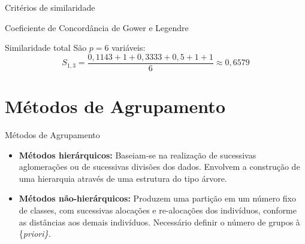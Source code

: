 \documentclass[
  ignorenonframetext,
  aspectratio=169,
]{beamer}
\providecommand{\tightlist}{%
  \setlength{\itemsep}{0pt}\setlength{\parskip}{0pt}}
\begin{document}
\begin{frame}{Critérios de similaridade}
\protect{}\label{crituxe9rios-de-similaridade-19}
\begin{block}{Coeficiente de Concordância de Gower e Legendre}
\protect{}\label{coeficiente-de-concorduxe2ncia-de-gower-e-legendre-12}
\begin{block}{Similaridade total}
\protect{}\label{similaridade-total}
São \(p=6\) variáveis: \[
S_{1,3}
=\dfrac{0,1143+1+0,3333+0,5+1+1}{6}
\approx 0,6579
\]
\end{block}
\end{block}
\end{frame}

\section{Métodos de Agrupamento}\label{muxe9todos-de-agrupamento}

\begin{frame}{Métodos de Agrupamento}
\protect{}\label{muxe9todos-de-agrupamento-1}
\begin{itemize}
\tightlist
\item
  \textbf{Métodos hierárquicos:} Baseiam-se na realização de sucessivas
  aglomerações ou de sucessivas divisões dos dados. Envolvem a
  construção de uma hierarquia através de uma estrutura do tipo árvore.
\end{itemize}

\pause

\begin{itemize}
\tightlist
\item
  \textbf{Métodos não-hierárquicos:} Produzem uma partição em um número
  fixo de classes, com sucessivas alocações e re-alocações dos
  indivíduos, conforme as distâncias aos demais indivíduos. Necessário
  definir o número de grupos à \{\it priori\}.
\end{itemize}
\end{frame}
\end{document}

